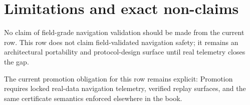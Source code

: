 
\section{{Limitations and exact non-claims}}
No claim of field-grade navigation validation should be made from the current row. This row does not claim field-validated navigation safety; it remains an architectural portability and protocol-design surface until real telemetry closes the gap.

The current promotion obligation for this row remains explicit: Promotion requires locked real-data navigation telemetry, verified replay surfaces, and the same certificate semantics enforced elsewhere in the book.
